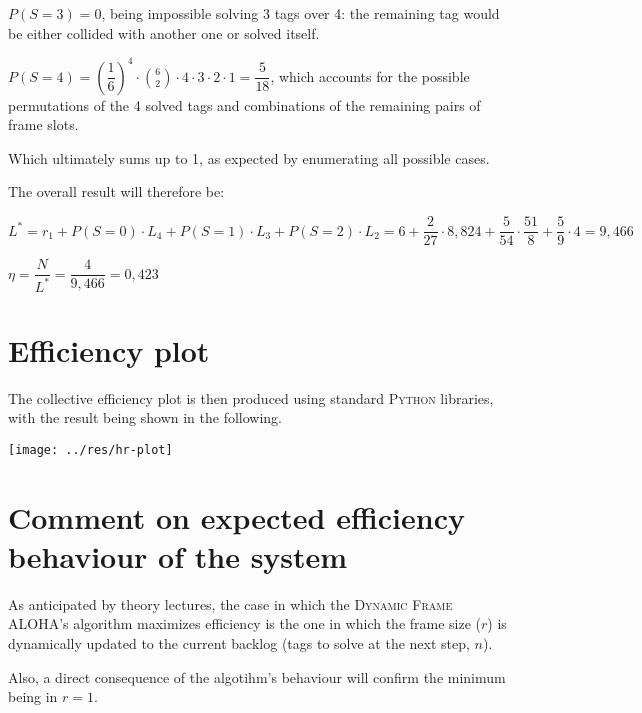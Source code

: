 \documentclass[a4paper,11pt]{article} %
\begin{document}
\medskip

$P(S = 3) = 0$, being impossible solving 3 tags over 4: the remaining tag would be either collided with another one or solved itself.

\medskip

$P(S = 4) = \left(\dfrac{1}{6}\right)^4 \cdot \displaystyle\binom{6}{2} \cdot 4 \cdot 3 \cdot 2 \cdot 1 = \dfrac{5}{18}$, which accounts for the possible permutations of the 4 solved tags and combinations of the remaining pairs of frame slots.

\medskip

Which ultimately sums up to 1, as expected by enumerating all possible cases.

\bigskip

The overall result will therefore be:

\medskip

$L^{*} = r_1 + P(S = 0) \cdot L_4 + P(S = 1) \cdot L_3 + P(S = 2) \cdot L_2 = 6 + \dfrac{2}{27} \cdot 8,824 + \dfrac{5}{54} \cdot \dfrac{51}{8} + \dfrac{5}{9} \cdot 4 = 9,466$

\medskip

$\eta = \dfrac{N}{L^{*}} = \dfrac{4}{9,466} = 0,423$

\section{Efficiency plot}

The collective efficiency plot is then produced using standard \textsc{Python} libraries, with the result being shown in the following.

\begin{center}
    \texttt{[image: ../res/hr-plot]}
\end{center}

\section{Comment on expected efficiency behaviour of the system}

As anticipated by theory lectures, the case in which the \textsc{Dynamic Frame ALOHA}'s algorithm maximizes efficiency is the one in which the frame size ($r$) is dynamically updated to the current backlog (tags to solve at the next step, $n$).

\smallskip

Also, a direct consequence of the algotihm's behaviour will confirm the minimum being in $r = 1$.
\end{document}
